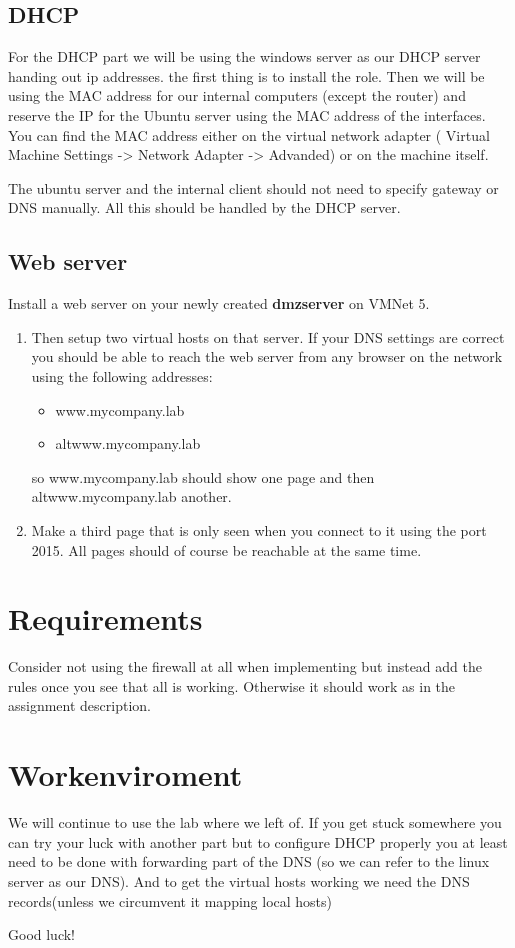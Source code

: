 \documentclass[paper=a4, fontsize=11pt]{report} %
\begin{document}
\subsection{DHCP}
For the DHCP part we will be using the windows server as our DHCP server handing out ip addresses. the first thing is to install the role. Then we will be using the MAC address for our internal computers (except the router) and reserve the IP for the Ubuntu server using the MAC address of the interfaces. You can find the MAC address either on the virtual network adapter ( Virtual Machine Settings -> Network Adapter -> Advanded) or on the machine itself.

The ubuntu server and the internal client should not need to specify gateway or DNS manually. All this should be handled by the DHCP server.

\subsection{Web server}
Install a web server on your newly created \textbf{dmzserver} on VMNet 5.
\begin{enumerate}
	\item Then setup two virtual hosts on that server. If your DNS settings are correct you should be able to reach the web server from any browser on the network using the following addresses:
		\begin{itemize}
			\item www.mycompany.lab
			\item altwww.mycompany.lab
		\end{itemize}
		so www.mycompany.lab should show one page and then altwww.mycompany.lab another.
	\item Make a third page that is only seen when you connect to it using the port 2015.
		All pages should of course be reachable at the same time.
\end{enumerate}


\section{Requirements}
Consider not using the firewall at all when implementing but instead add the rules once you see that all is working. Otherwise it should work as in the assignment description. 

\section{Workenviroment}
\label{enviroment}
We will continue to use the lab where we left of. If you get stuck somewhere you can try your luck with another part but to configure DHCP properly you at least need to be done with forwarding part of the DNS (so we can refer to the linux server as our DNS). And to get the virtual hosts working we need the DNS records(unless we circumvent it mapping local hosts)

Good luck!
\end{document}
